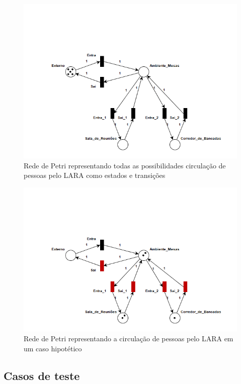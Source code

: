  \begin{figure}[H]
    \centering
    \includegraphics[width=0.8\linewidth]{figs/Metodologia/Petri_net.png}
    \caption{Rede de Petri representando todas as possibilidades circulação de pessoas pelo LARA como estados e transições}
    \label{fig:Petri1}
\end{figure}

 \begin{figure}[H]
    \centering
    \includegraphics[width=0.8\linewidth]{figs/Metodologia/Petri_net2.png}
    \caption{Rede de Petri representando a circulação de pessoas pelo LARA em um caso hipotético}
    \label{fig:Petri2}
\end{figure}
 
 

 
 
 
 
 \subsection{Casos de teste}
 
